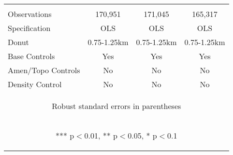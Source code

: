 \begin{tabular}{lccc}
\vspace{4pt} & \begin{footnotesize}\end{footnotesize} & \begin{footnotesize}\end{footnotesize} & \begin{footnotesize}\end{footnotesize} \\
Observations & 170,951 & 171,045 & 165,317 \\
Specification & OLS & OLS & OLS \\
Donut & 0.75-1.25km & 0.75-1.25km & 0.75-1.25km \\
Base Controls & Yes & Yes & Yes \\
Amen/Topo Controls & No & No & No \\
 Density Control & No & No & No \\ \hline
\multicolumn{4}{c}{\begin{footnotesize} Robust standard errors in parentheses\end{footnotesize}} \\
\multicolumn{4}{c}{\begin{footnotesize} *** p$<$0.01, ** p$<$0.05, * p$<$0.1\end{footnotesize}} \\
\end{tabular}


